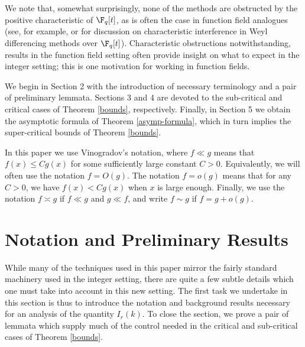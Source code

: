 \documentclass[reqno,11pt]{amsart}
\theoremstyle{definition}
\theoremstyle{remark}
\numberwithin{equation}{section}
\newcommand{\<}{\begin{equation}}
\renewcommand{\>}{\end{equation}}
\begin{document}
We note that, somewhat surprisingly, none of the methods are obstructed by the positive characteristic of $\F_q[t]$, as is often the case in function field analogues (see, for example, \cite{liu-wooley:2010} or \cite{effinger-hayes:1991} for discussion on characteristic interference in Weyl differencing methods over $\F_q[t]$). Characteristic obstructions notwithstanding, results in the function field setting often provide insight on what to expect in the integer setting; this is one motivation for working in function fields.

We begin in Section 2 with the introduction of necessary terminology and a pair of preliminary lemmata. Sections 3 and 4 are devoted to the sub-critical and critical cases of Theorem \ref{bounds}, respectively. Finally, in Section 5 we obtain the asymptotic formula of Theorem \ref{asymp-formula}, which in turn implies the super-critical bounds of Theorem \ref{bounds}.

In this paper we use Vinogradov's notation, where $f \ll g$ means that $f(x) \leq Cg(x)$ for some sufficiently large constant $C>0$. Equivalently, we will often use the notation $f = O(g)$. The notation $f = o(g)$ means that for any $C>0$, we have $f(x) < Cg(x)$ when $x$ is large enough. Finally, we use the notation $f \asymp g$ if $f \ll g$ and $g \ll f$, and write $f \sim g$ if $f = g + o(g)$.






















\section{Notation and Preliminary Results}

While many of the techniques used in this paper mirror the fairly standard machinery used in the integer setting, there are quite a few subtle details which one must take into account in this new setting. The first task we undertake in this section is thus to introduce the notation and background results necessary for an analysis of the quantity $I_r(k)$. To close the section, we prove a pair of lemmata which supply much of the control needed in the critical and sub-critical cases of Theorem \ref{bounds}.
\end{document}
